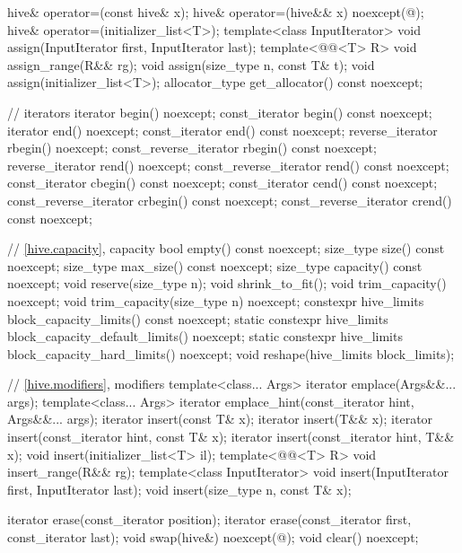 \begin{codeblock}
{{    hive& operator=(const hive& x);
    hive& operator=(hive&& x) noexcept(@\seebelow@);
    hive& operator=(initializer_list<T>);
    template<class InputIterator>
      void assign(InputIterator first, InputIterator last);
    template<@@<T> R>
      void assign_range(R&& rg);
    void assign(size_type n, const T& t);
    void assign(initializer_list<T>);
    allocator_type get_allocator() const noexcept;

    // iterators
    iterator               begin() noexcept;
    const_iterator         begin() const noexcept;
    iterator               end() noexcept;
    const_iterator         end() const noexcept;
    reverse_iterator       rbegin() noexcept;
    const_reverse_iterator rbegin() const noexcept;
    reverse_iterator       rend() noexcept;
    const_reverse_iterator rend() const noexcept;
    const_iterator         cbegin() const noexcept;
    const_iterator         cend() const noexcept;
    const_reverse_iterator crbegin() const noexcept;
    const_reverse_iterator crend() const noexcept;

    // \ref{hive.capacity}, capacity
    bool empty() const noexcept;
    size_type size() const noexcept;
    size_type max_size() const noexcept;
    size_type capacity() const noexcept;
    void reserve(size_type n);
    void shrink_to_fit();
    void trim_capacity() noexcept;
    void trim_capacity(size_type n) noexcept;
    constexpr hive_limits block_capacity_limits() const noexcept;
    static constexpr hive_limits block_capacity_default_limits() noexcept;
    static constexpr hive_limits block_capacity_hard_limits() noexcept;
    void reshape(hive_limits block_limits);

    // \ref{hive.modifiers}, modifiers
    template<class... Args> iterator emplace(Args&&... args);
    template<class... Args> iterator emplace_hint(const_iterator hint, Args&&... args);
    iterator insert(const T& x);
    iterator insert(T&& x);
    iterator insert(const_iterator hint, const T& x);
    iterator insert(const_iterator hint, T&& x);
    void insert(initializer_list<T> il);
    template<@@<T> R>
      void insert_range(R&& rg);
    template<class InputIterator>
      void insert(InputIterator first, InputIterator last);
    void insert(size_type n, const T& x);

    iterator erase(const_iterator position);
    iterator erase(const_iterator first, const_iterator last);
    void swap(hive&) noexcept(@\seebelow@);
    void clear() noexcept;

}}
\end{codeblock}

